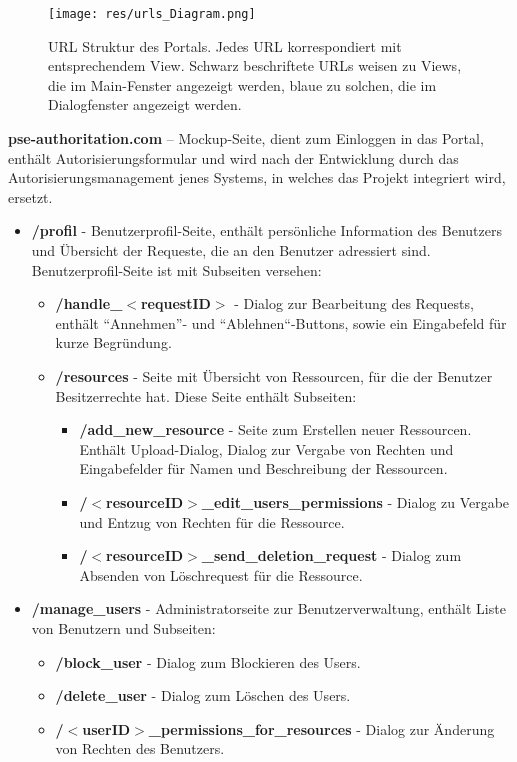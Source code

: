 \documentclass[parskip=full,11pt]{scrartcl}
\renewcommand{\labelitemii}{$\circ$}
\begin{document}
\begin{figure}[ht!]
 	\centering
 	\texttt{[image: res/urls\_Diagram.png]}
 	\caption{URL Struktur des Portals. Jedes URL korrespondiert mit entsprechendem View. Schwarz beschriftete URLs weisen zu Views, die im Main-Fenster angezeigt werden, blaue zu solchen, die im Dialogfenster angezeigt werden.}
 	\label{URL-Struktur}
 \end{figure}
 
\textbf{pse-authoritation.com} – Mockup-Seite, dient zum Einloggen in das Portal, enthält Autorisierungsformular und wird nach der Entwicklung durch das Autorisierungsmanagement jenes Systems, in welches das Projekt integriert wird, ersetzt. 
 
\renewcommand{\labelitemi}{$\bullet$}
\renewcommand{\labelitemii}{$\bullet$}
\renewcommand{\labelitemiii}{$\bullet$}
\begin{itemize}[itemsep=0pt]
\item \textbf{/profil} - Benutzerprofil-Seite, enthält persönliche Information des Benutzers und Übersicht der Requeste, die an den Benutzer adressiert sind.\\

Benutzerprofil-Seite ist mit Subseiten versehen:
\begin{itemize}[itemsep=0pt]
\item \textbf{/handle{\_}$<$requestID$>$} - Dialog zur Bearbeitung des Requests, enthält ``Annehmen''- und ``Ablehnen``-Buttons, sowie ein Eingabefeld für kurze Begründung.
\item \textbf{/resources} - Seite mit Übersicht von Ressourcen, für die der Benutzer Besitzerrechte hat. Diese Seite enthält Subseiten:
\begin{itemize}[itemsep=0pt]
\item \textbf{/add{\_}new{\_}resource} - Seite zum Erstellen neuer Ressourcen. Enthält Upload-Dialog, Dialog zur Vergabe von Rechten und Eingabefelder für Namen und Beschreibung der Ressourcen.
\item \textbf{/$<$resourceID$>${\_}edit{\_}users{\_}permissions} - Dialog zu Vergabe und Entzug von Rechten für die Ressource.
\item \textbf{/$<$resourceID$>${\_}send{\_}deletion{\_}request} - Dialog zum Absenden von Löschrequest für die Ressource.
\end{itemize}
\end{itemize}


\item \textbf{/manage{\_}users} - Administratorseite zur Benutzerverwaltung, enthält Liste von Benutzern und Subseiten:
\begin{itemize}[itemsep=0pt]
\item \textbf{/block{\_}user} - Dialog zum Blockieren des Users.
\item \textbf{/delete{\_}user} - Dialog zum Löschen des Users.
\item \textbf{/$<$userID$>${\_}permissions{\_}for{\_}resources} - Dialog zur Änderung von Rechten des Benutzers.
\end{itemize}


\end{itemize}
\end{document}
